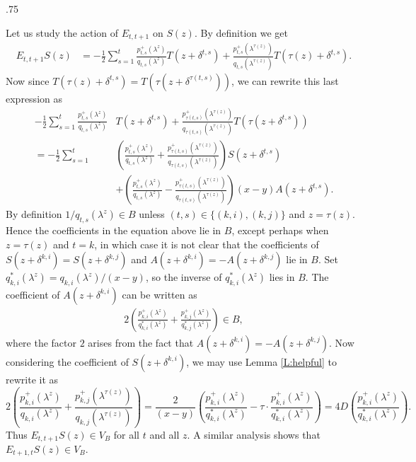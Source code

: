\documentclass[11pt,fleqn]{article}
\makeatletter
\newcounter{para}[section]
\renewenvironment{proof}[1][\textit{Proof}]{\par
  \pushQED{\qed}%
  \normalfont \topsep.75\paraskip\relax
  \trivlist
  \item[\hskip\labelsep
        \itshape
    #1\@addpunct{.}]\ignorespaces
}{%
  \popQED\endtrivlist\@endpefalse
}
\makeatother
\begin{document}
\begin{proof}
Let us study the action of $E_{t,t+1}$ on $S(z)$. By definition we get
\begin{align*}
E_{t,t+1} S(z)
	&= - \frac{1}{2}\sum_{s=1}^t 
			\frac{p_{t,s}^+(\lambda^z)}{q_{t,s}(\lambda^z)}T(z + \delta^{t,s}) 
			+ \frac{p_{t,s}^+(\lambda^{\tau(z)})}{q_{t,s}(\lambda^{\tau(z)})}
				T(\tau(z) + \delta^{t,s}).
\end{align*}
Now since $T(\tau(z) + \delta^{t,s}) = T(\tau(z+\delta^{\tau(t,s)}))$, we can 
rewrite this last expression as 
\begin{align*}
- \frac{1}{2}\sum_{s=1}^t 
	\frac{p_{t,s}^+(\lambda^z)}{q_{t,s}(\lambda^z)}&T(z + \delta^{t,s}) 
	+ \frac{p_{\tau(t,s)}^+(\lambda^{\tau(z)})}
		{q_{\tau(t,s)}(\lambda^{\tau(z)})} T(\tau(z + \delta^{t,s})) \\
= -\frac{1}{2} \sum_{s=1}^t
	&\left( 
		\frac{p_{t,s}^+(\lambda^z)}{q_{t,s}(\lambda^z)} + 
		\frac{p_{\tau(t,s)}^+(\lambda^{\tau(z)})}
			{q_{\tau(t,s)}(\lambda^{\tau(z)})}
	\right) S(z+\delta^{t,s}) \\
&+
	\left( 
		\frac{p_{t,s}^+(\lambda^z)}{q_{t,s}(\lambda^z)} - 
		\frac{p_{\tau(t,s)}^+(\lambda^{\tau(z)})}
			{q_{\tau(t,s)}(\lambda^{\tau(z)})}
	\right) (x-y)A(z+\delta^{t,s}).	
\end{align*}
By definition $1/q_{t,s}(\lambda^z) \in B$ unless $(t,s) \in \{(k,i), (k,j)\}$
and $z = \tau (z)$. Hence the coefficients in the equation above lie in $B$, 
except perhaps when $z = \tau(z)$ and $t = k$, in which case it is not clear 
that the coefficients of $S(z + \delta^{k,i}) = S(z+\delta^{k,j})$ and $A(z + 
\delta^{k,i}) = -A(z + \delta^{k,j})$ lie in $B$. Set $q_{k,i}^*(\lambda^z) = 
q_{k,i}(\lambda^z)/(x-y)$, so the inverse of $q_{k,i}^*(\lambda^z)$ lies in 
$B$. The coefficient of $A(z + \delta^{k,i})$ can be written as 
\begin{align*}
2\left( 
		\frac{p_{k,i}^+(\lambda^z)}{q^*_{k,i}(\lambda^z)} + 
		\frac{p_{k,j}^+(\lambda^z)}{q_{k,j}^*(\lambda^z)}
	\right) \in B,
\end{align*}
where the factor $2$ arises from the fact that $A(z + \delta^{k,i}) = -A(z + 
\delta^{k,j})$. Now considering the coefficient of $S(z+\delta^{k,i})$, we may
use Lemma \ref{L:helpful} to rewrite it as 
\[
2\left(
\frac{p^+_{k,i}(\lambda^z)}{q_{k,i}(\lambda^z)} 
+ \frac{p^+_{k,j}(\lambda^{\tau(z)})}{q_{k,j}(\lambda^{\tau(z)})}
\right)
= \frac{2}{(x-y)} \left(
	\frac{p^+_{k,i}(\lambda^z)}{q_{k,i}^*(\lambda^z)} -
		\tau \cdot \frac{p^+_{k,i}(\lambda^z)}{q^*_{k,i}(\lambda^z)}
	\right)
= 4D\left(
	\frac{p^+_{k,i}(\lambda^z)}{q_{k,i}^*(\lambda^z)}
	\right).
\]
Thus $E_{t,t+1} S(z) \in V_B$ for all $t$ and all $z$. A similar analysis 
shows that $E_{t+1,t} S(z) \in V_B$.


\end{proof}
\end{document}
